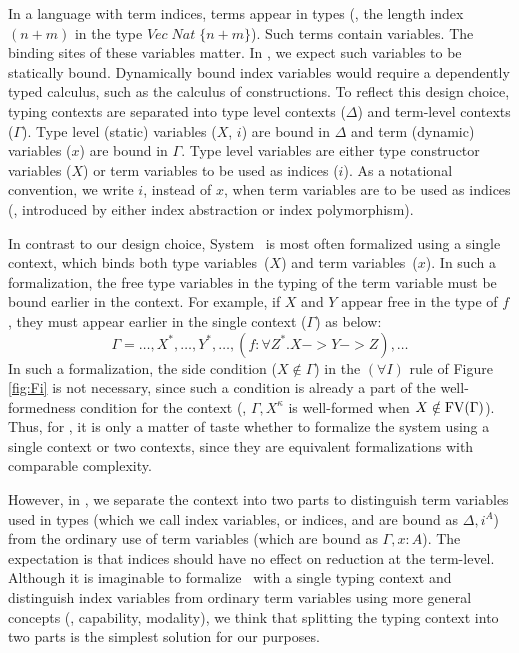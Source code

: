 In a language with term indices, terms appear in types (\eg, the length index
$(n+m)$ in the type $\textit{Vec}\;\textit{Nat}\;\{n+m\}$).
Such terms contain variables. The binding sites of these variables matter.
In \Fi, we expect such variables to be statically bound. Dynamically bound
index variables would require a dependently typed calculus, such as
the calculus of constructions. To reflect this design choice,
typing contexts are separated into type level contexts ($\Delta$) and
term-level contexts ($\Gamma$). Type level (static) variables ($X$, $i$) are
bound in $\Delta$ and term (dynamic) variables ($x$) are bound in $\Gamma$.
Type level variables are either type constructor variables ($X$) or
term variables to be used as indices ($i$). As a notational convention,
we write $i$, instead of $x$, when term variables are to be used as indices
(\ie, introduced by either index abstraction or index polymorphism).

In contrast to our design choice, System \Fw\ is most often formalized using
a single context, which binds both type variables~($X$) and term 
variables~($x$). 
In such a formalization, the free type variables in the typing of
the term variable must be bound earlier in the context. For example,
if $X$ and $Y$ appear free in the type of $f$, they must appear earlier
in the single context ($\Gamma$) as below:
\[ \Gamma = \dots,X^{\mathtt*},\dots,Y^{\mathtt*},\dots,
		(f:\forall Z^{\mathtt*}.X -> Y -> Z),\dots \]
In such a formalization, the side condition ($X\notin\Gamma$)
in the $(\forall I)$ rule of Figure \ref{fig:Fi} is not necessary,
since such a condition is already a part of the well-formedness condition
for the context (\ie, $\Gamma,X^\kappa$ is well-formed when
$X\notin\mathop{\mathrm{FV}}(\Gamma)$). Thus, for \Fw, it is only a matter of taste
whether to formalize the system using a single context or two contexts,
since they are equivalent formalizations with comparable complexity.

However, in \Fi, we separate the context into two parts to distinguish
term variables used in types (which we call index variables, or indices,
and are bound as $\Delta,i^A$) from the ordinary use of term variables
(which are bound as $\Gamma,x : A$). The expectation is that indices
should have no effect on reduction at the term-level.
Although it is imaginable to formalize \Fi\ with a single typing context
and distinguish index variables from ordinary term variables using
more general concepts (\eg, capability, modality), we think that splitting
the typing context into two parts is the simplest solution for our purposes.

